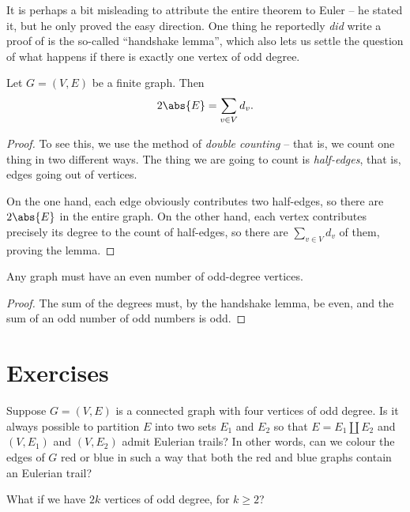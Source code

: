 \documentclass[nobib]{tufte-handout}
\begin{document}
It is perhaps a bit misleading to attribute the entire theorem to Euler -- he stated it, but he only proved the easy direction. One thing he reportedly \emph{did} write a proof of is the so-called ``handshake lemma'', which also lets us settle the question of what happens if there is exactly one vertex of odd degree.

\begin{lemma}
  Let $G = (V,E)$ be a finite graph. Then
    $$2\abs{E} = \sum_{v \in V} d_v.$$

  \begin{proof}
    To see this, we use the method of \emph{double counting} -- that is, we count one thing in two different ways. The thing we are going to count is \emph{half-edges}, that is, edges going out of vertices.

    On the one hand, each edge obviously contributes two half-edges, so there are $2\abs{E}$ in the entire graph. On the other hand, each vertex contributes precisely its degree to the count of half-edges, so there are $\sum_{v\in V} d_v$ of them, proving the lemma.
  \end{proof}
\end{lemma}

\begin{corollary}
  Any graph must have an even number of odd-degree vertices.
  \begin{proof}
    The sum of the degrees must, by the handshake lemma, be even, and the sum of an odd number of odd numbers is odd.
  \end{proof}
\end{corollary}

\section{Exercises}

\begin{xca}
  Suppose $G = (V, E)$ is a connected graph with four vertices of odd degree. Is it always possible to partition $E$ into two sets $E_1$ and $E_2$ so that $E = E_1 \coprod E_2$ and $(V, E_1)$ and $(V,E_2)$ admit Eulerian trails? In other words, can we colour the edges of $G$ red or blue in such a way that both the red and blue graphs contain an Eulerian trail?

  What if we have $2k$ vertices of odd degree, for $k \geq 2$?
\end{xca}

%
%
\end{document}
